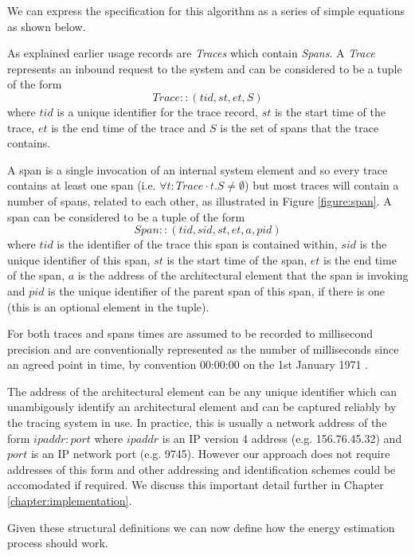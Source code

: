 We can express the specification for this algorithm as a series of simple equations as shown below.

As explained earlier usage records are \emph{Traces} which contain \emph{Spans}.  A \emph{Trace} represents an inbound request to the system and can be considered to be a tuple of the form 
\begin{equation}
Trace :: (tid, st, et, S)
\end{equation}
where $tid$ is a unique identifier for the trace record, $st$ is the start time of the trace, $et$ is the end time of the trace and $S$ is the set of spans that the trace contains.  

A span is a single invocation of an internal system element and so every trace contains at least one span (i.e. $\forall t : Trace \cdot t.S \neq \emptyset$) but most traces will contain a number of spans, related to each other, as illustrated in Figure \ref{figure:span}.  A span can be considered to be a tuple of the form
\begin{equation}
Span :: (tid, sid, st, et, a, pid)
\end{equation}
where $tid$ is the identifier of the trace this span is contained within, $sid$ is the unique identifier of this span, $st$ is the start time of the span, $et$ is the end time of the span, $a$ is the address of the architectural element that the span is invoking and $pid$ is the unique identifier of the parent span of this span, if there is one (this is an optional element in the tuple).

For both traces and spans times are assumed to be recorded to millisecond precision and are conventionally represented as the number of milliseconds since an agreed point in time, by convention 00:00:00 on the 1st January 1971 \cite{josey2004-ieee1003}.

The address of the architectural element can be any unique identifier which can unambigously identify an architectural element and can be captured reliably by the tracing system in use.  In practice, this is usually a network address of the form $ipaddr:port$ where $ipaddr$ is an IP version 4 address (e.g. 156.76.45.32) and $port$ is an IP network port (e.g. 9745).  However our approach does not require addresses of this form and other addressing and identification schemes could be accomodated if required.  We discuss this important detail further in Chapter \ref{chapter:implementation}.

Given these structural definitions we can now define how the energy estimation process should work.

